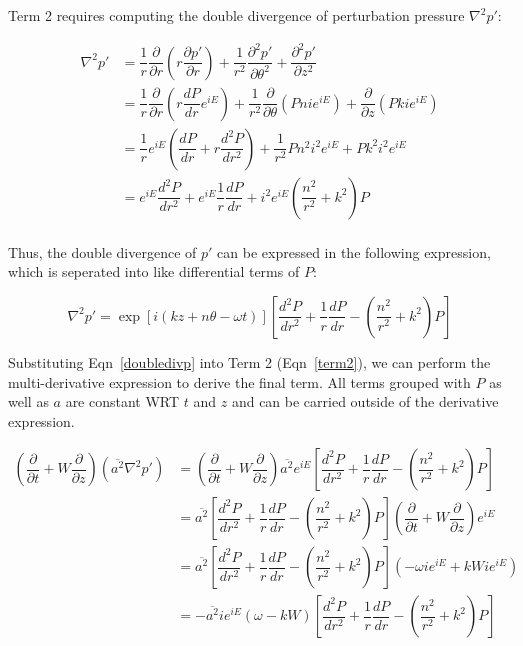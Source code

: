 \documentclass[]{aiaa-tc}%
\begin{document}
Term 2 requires computing the double divergence of perturbation pressure $\nabla^2 p'$:

\begin{align*}
\nabla^2p'
  &= \dfrac{1}{r}\dfrac{\partial}{\partial r} \left( r\dfrac{\partial p'}{\partial r} \right)
      + \dfrac{1}{r^2} \dfrac{\partial^2 p'}{\partial \theta^2}
      + \dfrac{\partial^2 p'}{\partial z^2} \\
&= \dfrac{1}{r}\dfrac{\partial}{\partial r} \left( r \dfrac{dP}{dr} e^{iE} \right)
      + \dfrac{1}{r^2} \dfrac{\partial }{\partial \theta} \left( Pn ie^{iE} \right)
      + \dfrac{\partial}{\partial z} \left( Pk ie^{iE} \right) \\
&= \dfrac{1}{r} e^{iE} \left(
    \dfrac{dP}{dr} + r \dfrac{d^2P}{dr^2} \right)
      + \dfrac{1}{r^2} Pn^2 i^2 e^{iE}
      + Pk^2 i^2  e^{iE} \\
&= e^{iE} \dfrac{d^2P}{dr^2}
    + e^{iE} \dfrac{1}{r} \dfrac{dP}{dr}
    + i^2 e^{iE} \left( \dfrac{n^2}{r^2} + k^2 \right) P \\
\end{align*}

Thus, the double divergence of $p'$ can be expressed in the following expression, which is seperated into like differential terms of $P$:

\begin{equation} \label{doubledivp}
\boxed{ \nabla^2p'= \exp[i(kz + n\theta -\omega t)] \left[
      \dfrac{d^2P}{dr^2}
    + \dfrac{1}{r} \dfrac{dP}{dr}
    - \left( \dfrac{n^2}{r^2} + k^2 \right) P \right] }
\end{equation}

Substituting Eqn~\ref{doubledivp} into Term 2 (Eqn~\ref{term2}), we can perform the multi-derivative expression to derive the final term.  All terms grouped with $P$ as well as $a$ are constant WRT $t$ and $z$ and can be carried outside of the derivative expression.

\begin{align*}
\left( \dfrac{\partial}{\partial t}
  + W \dfrac{\partial}{\partial z} \right)
  (\overline{a^2}\nabla^2p')
&= \left( \dfrac{\partial}{\partial t}
  + W \dfrac{\partial}{\partial z}
  \right) \overline{a^2} e^{iE} \left[
      \dfrac{d^2P}{dr^2}
    + \dfrac{1}{r} \dfrac{dP}{dr}
    - \left( \dfrac{n^2}{r^2} + k^2 \right) P \right] \\
&= \overline{a^2} \left[ \dfrac{d^2P}{dr^2}
          + \dfrac{1}{r} \dfrac{dP}{dr}
          - \left( \dfrac{n^2}{r^2} + k^2 \right) P \right]
    \left( \dfrac{\partial}{\partial t}
  + W \dfrac{\partial}{\partial z}
  \right) e^{iE} \\
&= \overline{a^2} \left[ \dfrac{d^2P}{dr^2}
          + \dfrac{1}{r} \dfrac{dP}{dr}
          - \left( \dfrac{n^2}{r^2} + k^2 \right) P \right]
  \left( -\omega ie^{iE} + kW ie^{iE}\right) \\
&= - \overline{a^2} ie^{iE} (\omega - kW) \left[ \dfrac{d^2P}{dr^2}
          + \dfrac{1}{r} \dfrac{dP}{dr}
          - \left( \dfrac{n^2}{r^2} + k^2 \right) P \right] \\
\end{align*}
\end{document}
